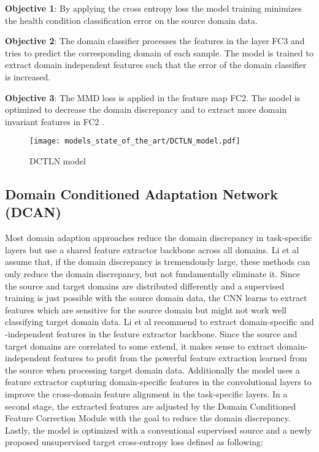 \textbf{Objective 1}: By applying the cross entropy loss the model training minimizes the health condition classification error on the source domain data.

\textbf{Objective 2}: The domain classifier processes the features in the layer FC3 and tries to predict the corresponding domain of each sample. The model is trained to extract domain independent features such that the error of the domain classifier is increased.

\textbf{Objective 3}: The MMD loss is applied in the feature map FC2. The model is optimized to decrease the domain discrepancy and to extract more domain invariant features in FC2 \cite{Guo2019}. 

\begin{figure}[p]
  \centering
  \texttt{[image: models\_state\_of\_the\_art/DCTLN\_model.pdf]}
  \caption{DCTLN model \cite{Guo2019}}
  \label{fig:DCTLN_model}
\end{figure}

\subsection{Domain Conditioned Adaptation Network (DCAN)}
Most domain adaption approaches reduce the domain discrepancy in task-specific layers but use a shared feature extractor backbone across all domains. Li et al \cite{li2020} assume that, if the domain discrepancy is tremendously large, these methods can only reduce the domain discrepancy, but not fundamentally eliminate it. Since the source and target domains are distributed differently and a supervised training is just possible with the source domain data, the CNN learns to extract features which are sensitive for the source domain but might not work well classifying target domain data. Li et al recommend to extract domain-specific and -independent features in the feature extractor backbone. Since the source and target domains are correlated to some extend, it makes sense to extract domain-independent features to profit from the powerful feature extraction learned from the source when processing target domain data. Additionally the model uses a feature extractor capturing domain-specific features in the convolutional layers to improve the cross-domain feature alignment in the task-specific layers. In a second stage, the extracted features are adjusted by the Domain Conditioned Feature Correction Module with the goal to reduce the domain discrepancy. Lastly, the model is optimized with a conventional supervised source and a newly proposed unsupervised target cross-entropy loss defined as following:

